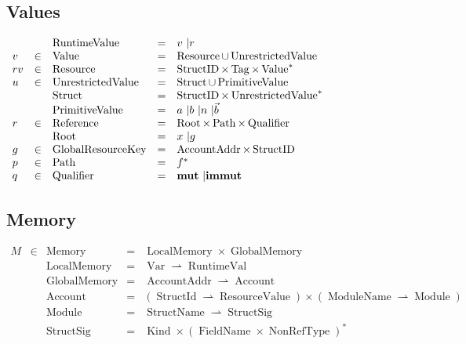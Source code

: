 \documentclass{article}
\newcommand{\tmop}[1]{\ensuremath{\operatorname{#1}}}
\newcommand{\tmstrong}[1]{\textbf{#1}}
\begin{document}
\subsection{Values}

$\begin{array}{lllll}
  &  & \tmop{RuntimeValue} & = & \text{$v$ \textbar $r$}\\
  v & \in & \tmop{Value} & = & \tmop{Resource} \cup \tmop{UnrestrictedValue}\\
  r v & \in & \tmop{Resource} & = & \tmop{StructID} \times \tmop{Tag} \times
  \tmop{Value}^{\ast}\\
  u & \in & \tmop{UnrestrictedValue} & = & \tmop{Struct} \cup
  \tmop{PrimitiveValue}\\
  &  & \tmop{Struct} & = & \tmop{StructID} \times
  \tmop{UnrestrictedValue}^{\ast}\\
  &  & \tmop{PrimitiveValue} & = & \text{$a$ \textbar $b$ \textbar $n$
  \textbar $\vec{b}$}\\
  r & \in & \tmop{Reference} & = & \tmop{Root} \times \tmop{Path} \times
  \tmop{Qualifier}\\
  &  & \tmop{Root} & = & \text{$x$ \textbar $g$}\\
  g & \in & \tmop{GlobalResourceKey} & = & \tmop{AccountAddr} \times
  \tmop{StructID}\\
  p & \in & \tmop{Path} & = & f^{\ast}\\
  q & \in & \tmop{Qualifier} & = & \text{{\tmstrong{mut}} \textbar
  {\tmstrong{immut}}}
\end{array}$

\subsection{Memory}

$\begin{array}{lllll}
  M & \in & \tmop{Memory} & = & \tmop{LocalMemory} \times
  \tmop{GlobalMemory}\\
  &  & \tmop{LocalMemory} & = & \tmop{Var} \rightharpoonup
  \tmop{RuntimeVal}\\
  &  & \tmop{GlobalMemory} & = & \tmop{AccountAddr} \rightharpoonup
  \tmop{Account}\\
  &  & \tmop{Account} & = & (\tmop{StructId} \rightharpoonup
  \tmop{ResourceValue}) \times (\tmop{ModuleName} \rightharpoonup
  \tmop{Module})\\
  &  & \tmop{Module} & = & \tmop{StructName} \rightharpoonup
  \tmop{StructSig}\\
  &  & \tmop{StructSig} & = & \tmop{Kind} \times (\tmop{FieldName} \times
  \tmop{NonRefType})^{\ast}
\end{array}$
\end{document}
